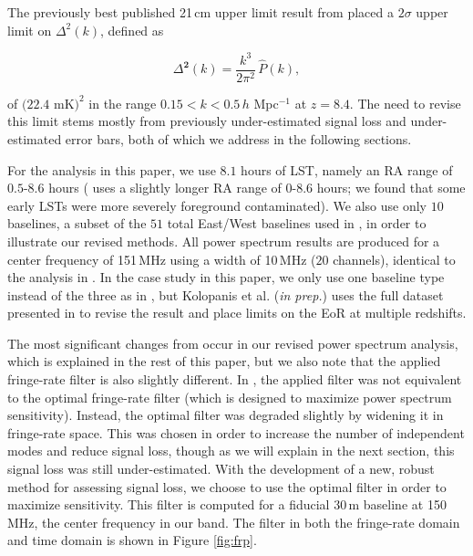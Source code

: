 \documentclass[preprint2,numberedappendix,tighten]{aastex6}  %
\begin{document}
The previously best published 21\,cm upper limit result from  placed a $2\sigma$ upper limit 
on $\Delta^{2}(k)$, defined as

\begin{equation}
\Delta^{\textbf{2}}(k) = \frac{k^{3}}{2\pi^{2}}\,\hat{P}(k),
\end{equation}

\noindent of $(22.4$ mK$)^{2}$ in the range $0.15 < k < 0.5$\,$h$ Mpc$^{-1}$ at $z = 8.4$. The need to revise this limit stems mostly from previously under-estimated signal loss and under-estimated error bars, both of which we 
address in the following sections. 

For the analysis in this paper, we use $8.1$ hours of LST, namely an RA range of $0.5$-$8.6$ hours ( uses a slightly longer RA 
range of $0$-$8.6$ hours; we found that some early LSTs were more severely foreground contaminated). We also use only $10$ baselines, a subset of the $51$ total East/West baselines used in , in order to illustrate our revised methods. All power spectrum results are produced for a center frequency of 151\,MHz using a width of 10\,MHz ($20$ channels), identical to the analysis in . In the case study in this paper, we only use one baseline type instead of the three as in 
, but Kolopanis et al. (\textit{in prep.}) uses the full dataset presented in  to revise the result and place limits on the EoR at multiple redshifts.

The most significant changes from  occur in our revised power spectrum analysis, which is explained in the rest of this paper, but we also note that the applied fringe-rate filter is also slightly different. In , the 
applied filter was not equivalent to the optimal fringe-rate filter (which is designed to maximize power spectrum sensitivity). Instead, the optimal filter was degraded slightly by widening it in fringe-rate space. This was chosen in order to increase the number of independent 
modes and reduce signal loss, though as we will explain in the next section, this signal loss was still under-estimated. With the development of a new, 
robust method for assessing signal loss, we choose to use the optimal filter in order to maximize sensitivity. This filter is 
computed for a fiducial 30\,m baseline at 150\,MHz, the center frequency in our band. The filter in both the fringe-rate 
domain and time domain is shown in Figure \ref{fig:frp}.
\end{document}
